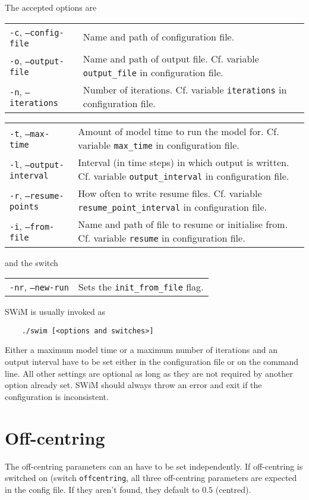 \documentclass[11pt,a4paper,openright,twoside]{book}
\newcommand{\thecodenospace}{SWiM}
\newcommand{\thecode}{\thecodenospace{ }}
\begin{document}
The accepted options are

\begin{tabular}{p{60mm}p{55mm}}
  \texttt{-c}, \texttt{--config-file} & Name and path of configuration file.\\
  \texttt{-o}, \texttt{--output-file} & Name and path of output file. Cf. variable \texttt{output\_file} in configuration file.\\
  \texttt{-n}, \texttt{--iterations} & Number of iterations. Cf. variable \texttt{iterations} in configuration file.
\end{tabular}
\newpage
\begin{tabular}{p{60mm}p{55mm}}
  \texttt{-t}, \texttt{--max-time} & Amount of model time to run the model for. Cf. variable \texttt{max\_time} in configuration file.\\
  \texttt{-l}, \texttt{--output-interval} & Interval (in time steps) in which output is written. Cf. variable \texttt{output\_interval} in configuration file.\\
  \texttt{-r}, \texttt{--resume-points} & How often to write resume files. Cf. variable \texttt{resume\_point\_interval} in configuration file.\\ 
  \texttt{-i}, \texttt{--from-file} & Name and path of file to resume or initialise from. Cf. variable \texttt{resume} in configuration file.\\
\end{tabular}

and the switch

\begin{tabular}{p{60mm}p{55mm}}
  \texttt{-nr}, \texttt{--new-run} & Sets the \texttt{init\_from\_file} flag.\\
\end{tabular}

\thecode is usually invoked as

\begin{verbatim}
    ./swim [<options and switches>]
\end{verbatim}

Either a maximum model time or a maximum number of iterations and an output interval have to be set either in the
configuration file or on the command line. All other settings are optional as long as they are not required
by another option already set. \thecode should always throw an error and exit if the configuration is inconsistent.

\section{Off-centring}
The off-centring parameters can an have to be set independently. If off-centring is switched on (switch \texttt{offcentring},
all three off-centring parameters are expected in the config file. If they aren't found, they default to $0.5$ (centred).
\end{document}
